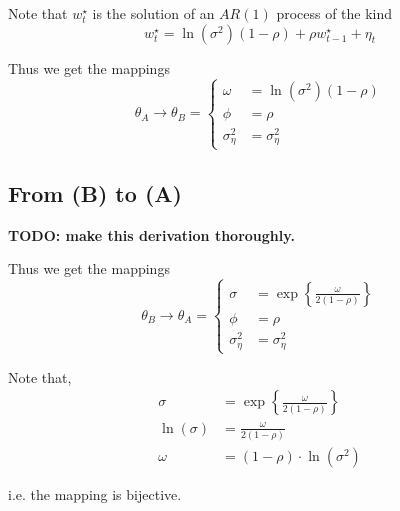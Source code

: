 \documentclass{article}
\begin{document}
Note that $w_{t}^{\star}$ is the solution of an $AR\left(1\right)$
process of the kind
\[
w_{t}^{\star}=\ln\left(\sigma^{2}\right)\left(1-\rho\right)+\rho w_{t-1}^{\star}+\eta_{t}
\]

Thus we get the mappings
\[
\theta_{A}\rightarrow\theta_{B}=\begin{cases}
\omega & =\ln\left(\sigma^{2}\right)\left(1-\rho\right)\\
\phi & =\rho\\
\sigma_{\eta}^{2} & =\sigma_{\eta}^{2}
\end{cases}
\]

\subsection{From (B) to (A)}

\textbf{TODO: make this derivation thoroughly.}

\bigskip

Thus we get the mappings
\[
\theta_{B}\rightarrow\theta_{A}=\begin{cases}
\sigma & =\exp\left\{ \frac{\omega}{2\left(1-\rho\right)}\right\} \\
\phi & =\rho\\
\sigma_{\eta}^{2} & =\sigma_{\eta}^{2}
\end{cases}
\]

Note that, 
\begin{align*}
\sigma & =\exp\left\{ \frac{\omega}{2\left(1-\rho\right)}\right\} \\
\ln\left(\sigma\right) & =\frac{\omega}{2\left(1-\rho\right)}\\
\omega & =\left(1-\rho\right)\cdot\ln\left(\sigma^{2}\right)
\end{align*}

i.e. the mapping is bijective.
\end{document}
